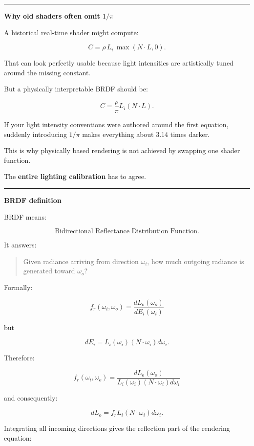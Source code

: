 \begin{center}\rule{0.5\linewidth}{0.5pt}\end{center}

\textbf{Why old shaders often omit \(1/\pi\)}

A historical real-time shader might compute:

\[
C=
\rho\,L_i\,\max(N\cdot L,0).
\]

That can look perfectly usable because light intensities are artistically tuned around the missing constant.

But a physically interpretable BRDF should be:

\[
C=
\frac{\rho}{\pi}
L_i
(N\cdot L).
\]

If your light intensity conventions were authored around the first equation, suddenly introducing \(1/\pi\) makes everything about 3.14 times darker.

This is why physically based rendering is not achieved by swapping one shader function.

The \textbf{entire lighting calibration} has to agree.

\begin{center}\rule{0.5\linewidth}{0.5pt}\end{center}

\textbf{BRDF definition}

BRDF means:

\[
\text{Bidirectional Reflectance Distribution Function}.
\]

It answers:

\begin{quote}
Given radiance arriving from direction \(\omega_i\), how much outgoing radiance is generated toward \(\omega_o\)?
\end{quote}

Formally:

\[
\boxed{
f_r(\omega_i,\omega_o)
=
\frac{dL_o(\omega_o)}
{dE_i(\omega_i)}
}
\]

but

\[
dE_i
=
L_i(\omega_i)
(N\cdot\omega_i)
d\omega_i.
\]

Therefore:

\[
\boxed{
f_r(\omega_i,\omega_o)
=
\frac{
dL_o(\omega_o)
}{
L_i(\omega_i)
(N\cdot\omega_i)
d\omega_i
}
}
\]

and consequently:

\[
dL_o
=
f_r
L_i
(N\cdot\omega_i)
d\omega_i.
\]

Integrating all incoming directions gives the reflection part of the rendering equation:

